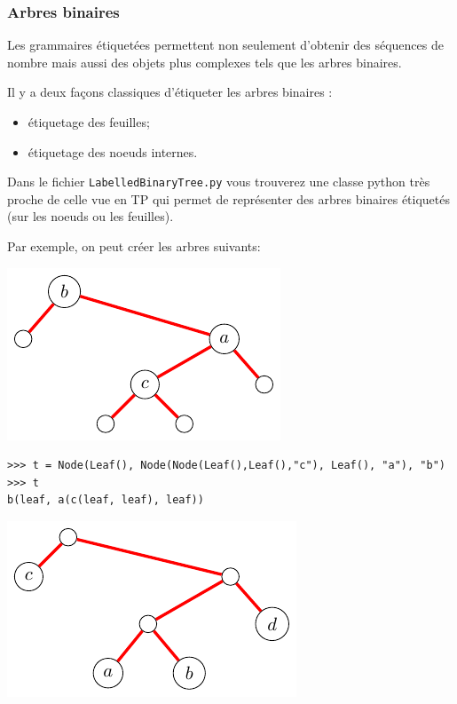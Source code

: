 \documentclass[11pt]{article}
\begin{document}
\subsubsection{Arbres binaires}
\label{seq:binary-trees}

Les grammaires étiquetées permettent non seulement d'obtenir des séquences de nombre
mais aussi des objets plus complexes tels que les arbres binaires.

Il y a deux façons classiques d'étiqueter les arbres binaires :
\begin{itemize}
\item étiquetage des feuilles;
\item étiquetage des noeuds internes.
\end{itemize}

Dans le fichier {\tt LabelledBinaryTree.py} vous trouverez une classe python très proche
de celle vue en TP qui permet de représenter des arbres binaires étiquetés (sur les noeuds
ou les feuilles).

Par exemple, on peut créer les arbres suivants:

\includegraphics[scale=.5]{images/arbre_etiquete1.pdf}

\begin{verbatim}
>>> t = Node(Leaf(), Node(Node(Leaf(),Leaf(),"c"), Leaf(), "a"), "b")
>>> t
b(leaf, a(c(leaf, leaf), leaf))
\end{verbatim}

\includegraphics[scale=.5]{images/arbre_etiquete2.pdf}
\end{document}
